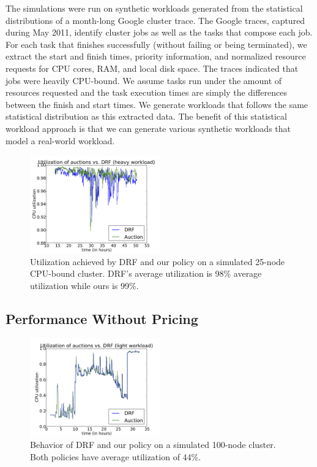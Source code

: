 \documentclass{acm_proc_article-sp}
\begin{document}
The simulations were run on synthetic workloads generated from the statistical distributions of a month-long Google cluster trace. The Google traces, captured during May 2011, identify cluster jobs as well as the tasks that compose each job. For each task that finishes successfully (without failing or being terminated), we extract the start and finish times, priority information, and normalized resource requests for CPU cores, RAM, and local disk space. The traces indicated that jobs were heavily CPU-bound. We assume tasks run under the amount of resources requested and the task execution times are simply the differences between the finish and start times. We generate workloads that follows the same statistical distribution as this extracted data. The benefit of this statistical workload approach is that we can generate various synthetic workloads that model a real-world workload.

\begin{figure}[ht]
\includegraphics[width=0.5\textwidth]{images/util_high.png}
\caption{Utilization achieved by DRF and our policy on a simulated 25-node CPU-bound cluster.  DRF's average utilization is 98\% average utilization while ours is 99\%.}
\label{img:util_high}
\end{figure}

\subsection{Performance Without Pricing}

\begin{figure}

\includegraphics[width=0.5\textwidth]{images/util_low.png}
\caption{Behavior of DRF and our policy on a simulated 100-node cluster. Both policies have average utilization of 44\%.}
\label{img:util_low}
\end{figure}
\end{document}
